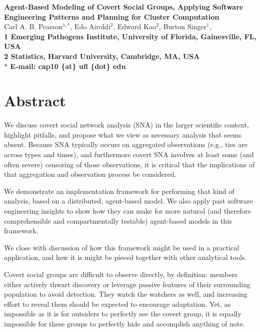 \documentclass{article}
\begin{document}

\begin{flushleft}
{\Large
\textbf{Agent-Based Modeling of Covert Social Groups, Applying Software Engineering Patterns and Planning for Cluster Computation}
}
\\
Carl A. B. Pearson$^{1,\ast}$, 
Edo Airoldi$^{2}$,
Edward Kao$^{2}$,
Burton Singer$^{1}$, 
\\
\bf{1} Emerging Pathogens Institute, University of Florida, Gainesville, FL, USA
\\
\bf{2} Statistics, Harvard University, Cambridge, MA, USA
\\
$\ast$ E-mail: cap10 \{at\} ufl \{dot\} edu
\end{flushleft}
\section*{Abstract}
We discuss covert social network analysis (SNA) in the larger scientific context, highlight pitfalls, and propose what we view as necessary analysis that seems absent.  Because SNA typically occurs on aggregated observations (e.g., ties are across types and times), and furthermore covert SNA involves at least some (and often severe) censoring of those observations, it is critical that the implications of that aggregation and observation process be considered.

We demonstrate an implementation framework for performing that kind of analysis, based on a distributed, agent-based model.  We also apply past software engineering insights to show how they can make for more natural (and therefore comprehensible and compartmentally testable) agent-based models in this framework.

We close with discussion of how this framework might be used in a practical application, and how it is might be pieced together with other analytical tools.

\newpage

Covert social groups are difficult to observe directly, by definition: members either actively thwart discovery or leverage passive features of their surrounding population to avoid detection.  They watch the watchers as well, and increasing effort to reveal them should be expected to encourage adaptation.  Yet, as impossible as it is for outsiders to perfectly see the covert group, it is equally impossible for these groups to perfectly hide and accomplish anything of note.
\end{document}

